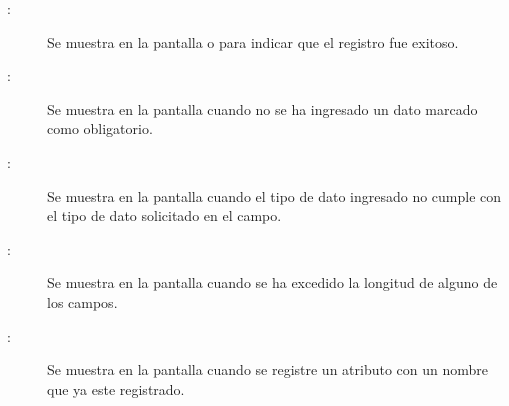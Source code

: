 	
\begin{description}
	\item[:] Se muestra en la pantalla  o  para indicar que el registro fue exitoso.
	\item[:] Se muestra en la pantalla  cuando no se ha ingresado un dato marcado como obligatorio.
	\item[:] Se muestra en la pantalla  cuando el tipo de dato ingresado no cumple con el tipo de dato solicitado en el campo.
	\item[:] Se muestra en la pantalla  cuando se ha excedido la longitud de alguno de los campos.
	\item[:] Se muestra en la pantalla  cuando se registre un atributo con un nombre que ya este registrado.
\end{description}

